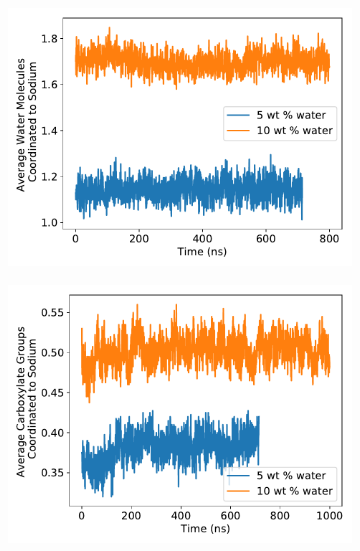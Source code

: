 \documentclass{article}
\begin{document}
  \begin{figure}[!htb]
  \centering
  \begin{subfigure}{0.45\textwidth}
  \includegraphics[width=\textwidth]{Na_water_coordination.pdf}
  \caption{}\label{fig:na_water_coordination}
  \end{subfigure}
  \begin{subfigure}{0.45\textwidth}
  \includegraphics[width=\textwidth]{Na_hg_coordination.pdf}
  \caption{}\label{fig:na_hg_coordination}
  \end{subfigure}
  \end{figure}
  
\end{document}
